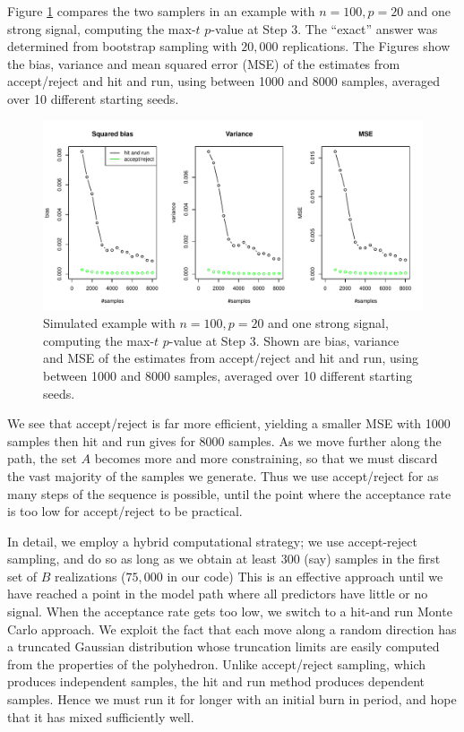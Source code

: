 \documentclass{article}
\begin{document}
\begin{appendix}
Figure \ref{fig:comparison} compares the two samplers in an example with $n=100, p=20$ and one strong signal, computing the max-$t$ $p$-value at Step 3.
The ``exact'' answer was determined from bootstrap sampling with $20,000$ replications.
The Figures show the bias, variance and mean squared error (MSE) of the estimates from accept/reject and hit and run, using between 1000 and 8000 samples, averaged
over 10 different starting seeds.
\begin{figure}[htp]
\centering
  \includegraphics[width=\textwidth]{figs/comparison.pdf}
  \caption{ Simulated example with $n= 100, p=20$ and one strong signal, computing the max-$t$ $p$-value at Step 3.  Shown are bias, variance and MSE of the estimates from accept/reject and hit and run, using between 1000 and 8000 samples, averaged over 10 different starting seeds.
}
\label{fig:comparison}
\end{figure}
We see that accept/reject is far more efficient, yielding a smaller MSE with 1000 samples then hit and run gives for 8000 samples. As we move further along the path, the set $A$ becomes more and more constraining, so that we must discard the vast majority of the samples we generate. Thus we use accept/reject for as many steps of the sequence is possible,  until the point where the acceptance rate is too low for accept/reject to be practical.


In detail, we employ a hybrid computational strategy; we use accept-reject sampling, and do so as long as we obtain at least 300 (say) samples in the first set of $B$ realizations ($75,000$ in our code)  This is an effective approach until we have reached a point in the model path where all predictors have little or no signal. When the acceptance rate gets too low, we switch to a hit-and run Monte Carlo approach. We exploit the fact that each move along a random direction  has a truncated Gaussian distribution whose truncation limits are easily computed from the properties of the polyhedron. Unlike accept/reject sampling, which produces independent samples,  the hit and run method produces dependent samples. Hence we must run it for longer with an initial burn in period, and hope that it has mixed sufficiently well.


\end{appendix}
\end{document}
